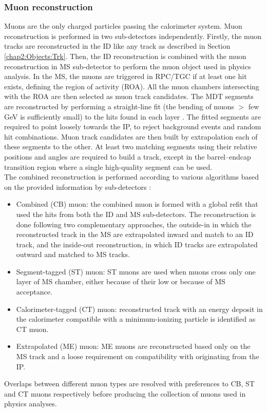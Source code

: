 \subsubsection{Muon reconstruction}
\label{chap2:Objects:Muon:Reco}
Muons are the only charged particles passing the calorimeter system. Muon reconstruction is performed in two sub-detectors independently. Firstly, the muon tracks are reconstructed in the ID like any track as described in Section \ref{chap2:Objects:Trk}. Then, the ID reconstruction is combined with the muon reconstruction in MS sub-detector to perform the muon object used in physics analysis. In the MS, the muons are triggered in RPC/TGC if at least one hit exists, defining the region of activity (ROA). All the muon chambers intersecting with the ROA are then selected as muon track candidates. The MDT segments are reconstructed by performing a straight-line fit (the bending of muons $>$ few GeV is sufficiently small) to the hits found in each layer \cite{hough}. The fitted segments are required to point loosely towards the IP, to reject background events and random hit combinations. Muon track candidates are then built by extrapolation each of these segments to the other. At least two matching segments using their relative positions and angles are required to build a track, except in the barrel–endcap transition region where a single high-quality segment can be used. \\
The combined reconstruction is performed according to various algorithms based on the provided information by sub-detectors \cite{Muon_Reco_2014_algo,Muon_Reco_2016_algo}: 
\begin{itemize}
    \item Combined (CB) muon: the combined muon is formed with a global refit that used the hits from both the ID and MS sub-detectors. The reconstruction is done following two complementary approaches, the outside-in in which the reconstructed track in the MS are extrapolated inward and match to an ID track, and the inside-out reconstruction, in which ID tracks are extrapolated outward and matched to MS tracks.
    \item Segment-tagged (ST) muon: ST muons are used when muons cross only one layer of MS chamber, either because of their low \pT or because of MS acceptance. 
    \item Calorimeter-tagged (CT) muon: reconstructed track with an energy deposit in the calorimeter compatible with a minimum-ionizing particle is identified as CT muon. 
    \item Extrapolated (ME) muon: ME muons are reconstructed based only on the MS track and a loose requirement on compatibility with originating from the IP. 
\end{itemize}
Overlaps between different muon types are resolved with preferences to CB, ST and CT muons respectively before producing the collection of muons used in physics analyses.

